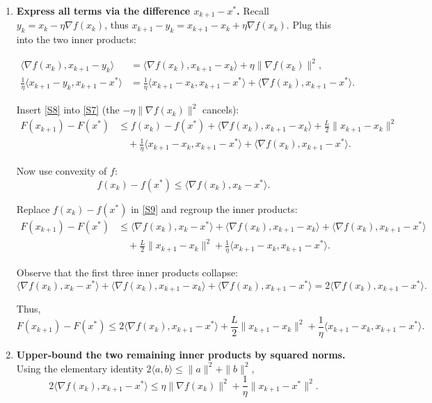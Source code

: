 \documentclass{article}
\begin{document}
\begin{enumerate}
\item[Step 6.] \textbf{Express all terms via the difference $x_{k+1}-x^{*}$.}
Recall $y_{k}=x_{k}-\eta\nabla f(x_{k})$, thus $x_{k+1}-y_{k}=x_{k+1}-x_{k}+\eta\nabla f(x_{k})$.
Plug this into the two inner products:

\[
\begin{aligned}
\langle\nabla f(x_{k}),x_{k+1}-y_{k}\rangle
&= \langle\nabla f(x_{k}),x_{k+1}-x_{k}\rangle+\eta\|\nabla f(x_{k})\|^{2},\\[2mm]
\frac{1}{\eta}\langle x_{k+1}-y_{k},x_{k+1}-x^{*}\rangle
&= \frac{1}{\eta}\langle x_{k+1}-x_{k},x_{k+1}-x^{*}\rangle
   +\langle\nabla f(x_{k}),x_{k+1}-x^{*}\rangle .
\end{aligned}
\tag{S8}
\]

Insert \eqref{S8} into \eqref{S7} (the $-\eta\|\nabla f(x_{k})\|^{2}$ cancels):
\[
\begin{aligned}
F(x_{k+1})-F(x^{*})
&\le f(x_{k})-f(x^{*})
   +\langle\nabla f(x_{k}),x_{k+1}-x_{k}\rangle
   +\frac{L}{2}\|x_{k+1}-x_{k}\|^{2}\\
&\quad +\frac{1}{\eta}\langle x_{k+1}-x_{k},x_{k+1}-x^{*}\rangle
   +\langle\nabla f(x_{k}),x_{k+1}-x^{*}\rangle .
\end{aligned}
\tag{S9}
\]

Now use convexity of $f$:
\[
f(x_{k})-f(x^{*})\le\langle\nabla f(x_{k}),x_{k}-x^{*}\rangle .
\tag{S10}
\]

Replace $f(x_{k})-f(x^{*})$ in \eqref{S9} and regroup the inner products:
\[
\begin{aligned}
F(x_{k+1})-F(x^{*})
&\le \langle\nabla f(x_{k}),x_{k}-x^{*}\rangle
   +\langle\nabla f(x_{k}),x_{k+1}-x_{k}\rangle
   +\langle\nabla f(x_{k}),x_{k+1}-x^{*}\rangle \\
&\quad +\frac{L}{2}\|x_{k+1}-x_{k}\|^{2}
   +\frac{1}{\eta}\langle x_{k+1}-x_{k},x_{k+1}-x^{*}\rangle .
\end{aligned}
\tag{S11}
\]

Observe that the first three inner products collapse:
\[
\langle\nabla f(x_{k}),x_{k}-x^{*}\rangle
+\langle\nabla f(x_{k}),x_{k+1}-x_{k}\rangle
+\langle\nabla f(x_{k}),x_{k+1}-x^{*}\rangle
=2\langle\nabla f(x_{k}),x_{k+1}-x^{*}\rangle .
\tag{S12}
\]

Thus,
\[
F(x_{k+1})-F(x^{*})
\le 2\langle\nabla f(x_{k}),x_{k+1}-x^{*}\rangle
   +\frac{L}{2}\|x_{k+1}-x_{k}\|^{2}
   +\frac{1}{\eta}\langle x_{k+1}-x_{k},x_{k+1}-x^{*}\rangle .
\tag{S13}
\]

\item[Step 7.] \textbf{Upper‑bound the two remaining inner products by squared norms.}
Using the elementary identity $2\langle a,b\rangle\le\|a\|^{2}+\|b\|^{2}$,
\[
2\langle\nabla f(x_{k}),x_{k+1}-x^{*}\rangle
\le \eta\|\nabla f(x_{k})\|^{2}+\frac{1}{\eta}\|x_{k+1}-x^{*}\|^{2}.
\tag{S14}
\]


\end{enumerate}
\end{document}
